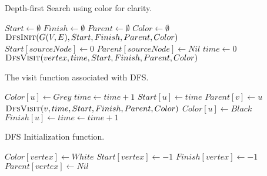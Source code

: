 \documentclass{article}
\begin{document}
\pagebreak
\begin{algorithm}[H]
    \caption{
        Depth-first Search using color for clarity.
    }
    \label{alg:algorithm-label}
    \begin{algorithmic}[1]
            \State $ Start \gets \emptyset $
            \State $ Finish \gets \emptyset $
            \State $ Parent \gets \emptyset $
            \State $ Color \gets \emptyset $                        
            \State $ \Call{DfsInit}{G(V, E), Start, Finish, Parent, Color } $
            \\                 
            \State $ Start[sourceNode] \gets 0 $
            \State $ Parent[sourceNode] \gets Nil $                                    
            \State $ time \gets 0 $            
                    \State $ \Call{DfsVisit}{vertex, time, Start, Finish, Parent, Color} $
                \EndIf
            \EndFor            
        \EndFunction
    \end{algorithmic}
\end{algorithm}

\begin{algorithm}[H]
    \caption{
        The visit function associated with DFS.
    }
    \label{alg:algorithm-label}
    \begin{algorithmic}[1]
            \State $ Color[u] \gets Grey $
            \State $ time \gets time + 1 $
            \State $ Start[u] \gets time $
                    \State $ Parent[v] \gets u $
                    \State $ \Call{DfsVisit}{v, time, Start, Finish, Parent, Color} $
                \EndIf
            \EndFor
            \State $ Color[u] \gets Black $
            \State $ Finish[u] \gets time \gets time + 1 $
        \EndFunction
    \end{algorithmic}
\end{algorithm}

\begin{algorithm}[H]
    \caption{
        DFS Initialization function.
    }
    \label{alg:algorithm-label}
    \begin{algorithmic}[1]
                \State $ Color[vertex] \gets White $
                \State $ Start[vertex] \gets -1 $
                \State $ Finish[vertex] \gets -1 $
                \State $ Parent[vertex] \gets Nil $
            \EndFor
        \EndFunction
    \end{algorithmic}
\end{algorithm}
\end{document}
